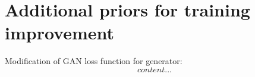 \section{Additional priors for training improvement}


Modification of GAN loss function for generator:
\begin{equation}
	content...
\end{equation}